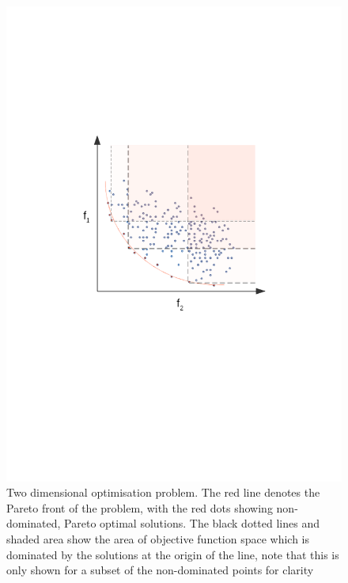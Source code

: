 			
			\begin{figure}[h]
			
				\centering 
				\includegraphics[trim= 250 380 250 210 ,scale=0.55]{pareto.png}


				\caption{Two dimensional optimisation problem. The red line denotes the Pareto front of the problem, with the red dots showing non-dominated, Pareto optimal solutions. The black dotted lines and shaded area show the area of objective function space which is dominated by the solutions at the origin of the line, note that this is only shown for a subset of the non-dominated points for clarity}
				\label{fig:GA3}


			\end{figure}










